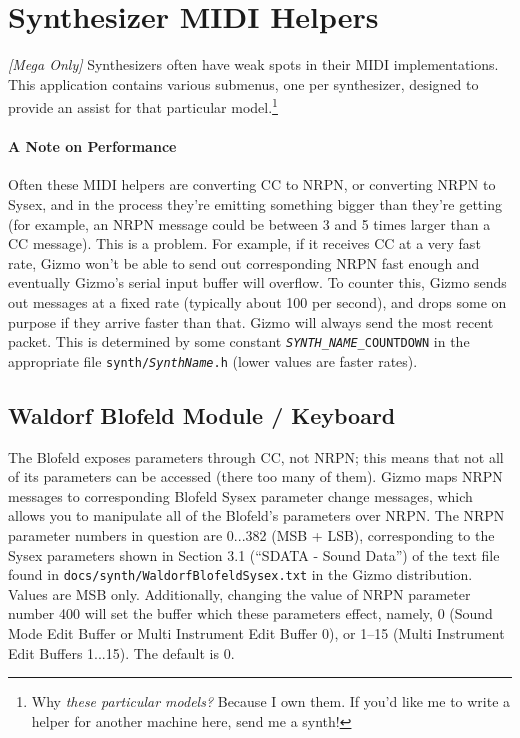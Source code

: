 \documentclass{article}
\begin{document}
\clearpage
\section {Synthesizer MIDI Helpers}
\label{synthesizer}

\textit{[Mega Only]} Synthesizers often have weak spots in their MIDI implementations.  This application contains various submenus, one per synthesizer, designed to provide an assist for that particular model.\footnote{Why {\it these particular models?}  Because I own them. If you'd like me to write a helper for another machine here, send me a synth!}

\paragraph{A Note on Performance} Often these MIDI helpers are converting CC to NRPN, or converting NRPN to Sysex, and in the process they're emitting something bigger than they're getting (for example, an NRPN message could be between 3 and 5 times larger than a CC message).  This is a problem.  For example, if it receives CC at a very fast rate, Gizmo won't be able to send out corresponding NRPN fast enough and eventually Gizmo's serial input buffer will overflow.  To counter this, Gizmo sends out messages at a fixed rate (typically about 100 per second), and drops some on purpose if they arrive faster than that.   Gizmo will always send the most recent packet.  This is determined by some constant \texttt{\textit{SYNTH\_NAME}\_COUNTDOWN} in the appropriate file \texttt{synth/\textit{SynthName}.h} (lower values are faster rates).


\subsection{Waldorf Blofeld Module / Keyboard}  The Blofeld exposes parameters through CC, not NRPN; this means that not all of its parameters can be accessed (there too many of them).  Gizmo maps NRPN messages to corresponding Blofeld Sysex parameter change messages, which allows you to manipulate all of the Blofeld's parameters over NRPN.  The NRPN parameter numbers in question are 0...382 (MSB + LSB), corresponding to the Sysex parameters shown in Section 3.1 (``SDATA - Sound Data'') of the text file found in \texttt{docs/synth/WaldorfBlofeldSysex.txt} in the Gizmo distribution.  Values are MSB only.  Additionally, changing the value of NRPN parameter number 400 will set the buffer which these parameters effect, namely, 0 (Sound Mode Edit Buffer or Multi Instrument Edit Buffer 0), or 1--15 (Multi Instrument Edit Buffers 1...15).  The default is 0.
\end{document}
